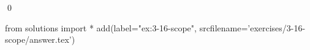 
\begin{ex}
  \label{ex:3-16-scope}
  
  \qed
\end{ex}
\begin{python0}
from solutions import *
add(label="ex:3-16-scope",
    srcfilename='exercises/3-16-scope/answer.tex')
\end{python0}
